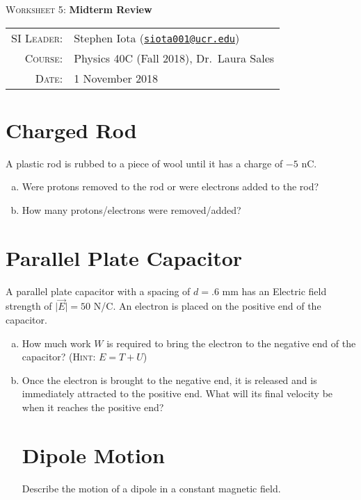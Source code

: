\documentclass[12pt]{article}
\newcommand{\email}[1]{\texttt{\href{mailto:#1}{#1}}}
\begin{document}
\begin{center}

\Large{\textsc{Worksheet 5}: \textbf{Midterm Review}}

\end{center}

\vspace{.5mm}


\begin{tabular}{rl}
\textsc{SI Leader}:
&
Stephen Iota (\email{siota001@ucr.edu})
\\
\textsc{Course}:
&
Physics 40C (Fall 2018), Dr.~Laura Sales
\\
\textsc{Date}:
&
1 November 2018
\end{tabular}



\section{Charged Rod}

A plastic rod is rubbed to a piece of wool until it has a charge of $-5$ nC.
\begin{enumerate}[(a)]
	\item Were protons removed to the rod or were electrons added to the rod?
	\item How many protons/electrons were removed/added?
\end{enumerate}

\section{Parallel Plate Capacitor}
A parallel plate capacitor with a spacing of $d = .6$ mm has an Electric field strength of $\lvert \vec{E}\rvert = 50$ N/C. An electron is placed on the positive end of the capacitor.
\begin{enumerate}[(a)]
\item How much work $W$  is required to bring the electron to the negative end of the capacitor? (\textsc{Hint:} $E = T + U$)

\item Once the electron is brought to the negative end, it is released and is immediately attracted to the positive end. What will its final velocity be when it reaches the positive end?


\section{Dipole Motion}

Describe the motion of a dipole in a constant magnetic field. 

 
\end{enumerate}
\end{document}
